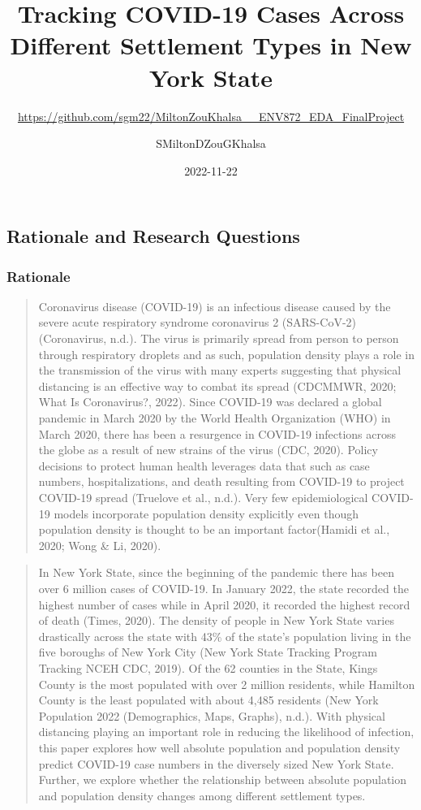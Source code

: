 \documentclass[
  12pt,
]{article}
\title{Tracking COVID-19 Cases Across Different Settlement Types in New
York State}
\subtitle{\url{https://github.com/sgm22/MiltonZouKhalsa__ENV872_EDA_FinalProject}}
\author{SMiltonDZouGKhalsa}
\date{2022-11-22}
\begin{document}
\maketitle

{
\setcounter{tocdepth}{2}
\tableofcontents
}
\newpage
\listoffigures 
\newpage

\hypertarget{rationale-and-research-questions}{%
\subsection{Rationale and Research
Questions}\label{rationale-and-research-questions}}

\hypertarget{rationale}{%
\subsubsection{Rationale}\label{rationale}}

\begin{quote}
Coronavirus disease (COVID-19) is an infectious disease caused by the
severe acute respiratory syndrome coronavirus 2 (SARS-CoV-2)
(Coronavirus, n.d.). The virus is primarily spread from person to person
through respiratory droplets and as such, population density plays a
role in the transmission of the virus with many experts suggesting that
physical distancing is an effective way to combat its spread (CDCMMWR,
2020; What Is Coronavirus?, 2022). Since COVID-19 was declared a global
pandemic in March 2020 by the World Health Organization (WHO) in March
2020, there has been a resurgence in COVID-19 infections across the
globe as a result of new strains of the virus (CDC, 2020). Policy
decisions to protect human health leverages data that such as case
numbers, hospitalizations, and death resulting from COVID-19 to project
COVID-19 spread (Truelove et al., n.d.). Very few epidemiological
COVID-19 models incorporate population density explicitly even though
population density is thought to be an important factor(Hamidi et al.,
2020; Wong \& Li, 2020).
\end{quote}

\begin{quote}
In New York State, since the beginning of the pandemic there has been
over 6 million cases of COVID-19. In January 2022, the state recorded
the highest number of cases while in April 2020, it recorded the highest
record of death (Times, 2020). The density of people in New York State
varies drastically across the state with 43\% of the state's population
living in the five boroughs of New York City (New York State Tracking
Program \textbar{} Tracking \textbar{} NCEH \textbar{} CDC, 2019). Of
the 62 counties in the State, Kings County is the most populated with
over 2 million residents, while Hamilton County is the least populated
with about 4,485 residents (New York Population 2022 (Demographics,
Maps, Graphs), n.d.). With physical distancing playing an important role
in reducing the likelihood of infection, this paper explores how well
absolute population and population density predict COVID-19 case numbers
in the diversely sized New York State. Further, we explore whether the
relationship between absolute population and population density changes
among different settlement types.
\end{quote}
\end{document}
